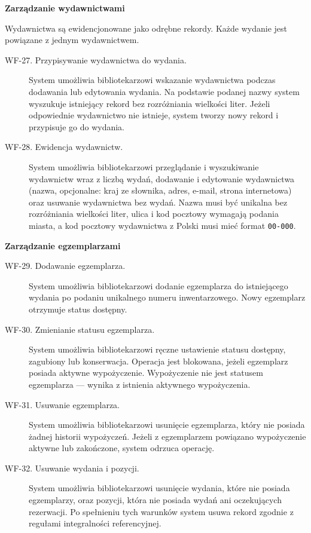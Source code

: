 \documentclass[11pt, a4paper]{article}
\begin{document}
\noindent\textbf{Zarządzanie wydawnictwami}

Wydawnictwa są ewidencjonowane jako odrębne rekordy. Każde wydanie jest powiązane z jednym wydawnictwem.

\begin{description}
\item[WF-27. Przypisywanie wydawnictwa do wydania.] System umożliwia bibliotekarzowi wskazanie wydawnictwa podczas dodawania lub edytowania wydania. Na podstawie podanej nazwy system wyszukuje istniejący rekord bez rozróżniania wielkości liter. Jeżeli odpowiednie wydawnictwo nie istnieje, system tworzy nowy rekord i przypisuje go do wydania.
\item[WF-28. Ewidencja wydawnictw.] System umożliwia bibliotekarzowi przeglądanie i wyszukiwanie wydawnictw wraz z liczbą wydań, dodawanie i edytowanie wydawnictwa (nazwa, opcjonalne: kraj ze słownika, adres, e-mail, strona internetowa) oraz usuwanie wydawnictwa bez wydań. Nazwa musi być unikalna bez rozróżniania wielkości liter, ulica i kod pocztowy wymagają podania miasta, a kod pocztowy wydawnictwa z Polski musi mieć format \texttt{00-000}.
\end{description}

\noindent\textbf{Zarządzanie egzemplarzami}

\begin{description}
\item[WF-29. Dodawanie egzemplarza.] System umożliwia bibliotekarzowi dodanie egzemplarza do istniejącego wydania po podaniu unikalnego numeru inwentarzowego. Nowy egzemplarz otrzymuje status dostępny.
\item[WF-30. Zmienianie statusu egzemplarza.] System umożliwia bibliotekarzowi ręczne ustawienie statusu dostępny, zagubiony lub konserwacja. Operacja jest blokowana, jeżeli egzemplarz posiada aktywne wypożyczenie. Wypożyczenie nie jest statusem egzemplarza --- wynika z istnienia aktywnego wypożyczenia.
\item[WF-31. Usuwanie egzemplarza.] System umożliwia bibliotekarzowi usunięcie egzemplarza, który nie posiada żadnej historii wypożyczeń. Jeżeli z egzemplarzem powiązano wypożyczenie aktywne lub zakończone, system odrzuca operację.
\item[WF-32. Usuwanie wydania i pozycji.] System umożliwia bibliotekarzowi usunięcie wydania, które nie posiada egzemplarzy, oraz pozycji, która nie posiada wydań ani oczekujących rezerwacji. Po spełnieniu tych warunków system usuwa rekord zgodnie z regułami integralności referencyjnej.
\end{description}
\end{document}
